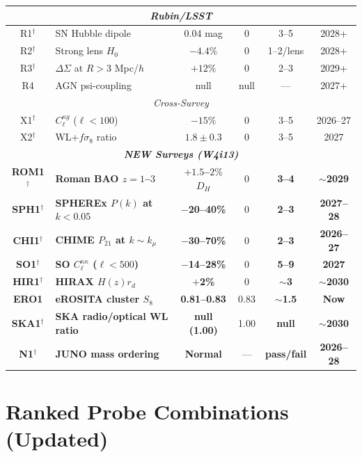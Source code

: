 \documentclass[11pt,a4paper]{article}
\begin{document}
\begin{longtable}{clcccc}
\midrule
\multicolumn{6}{c}{\textit{Rubin/LSST}} \\
\midrule
R1$^{\dagger}$ & SN Hubble dipole & 0.04 mag & 0 & 3--5 & 2028+ \\
R2$^{\dagger}$ & Strong lens $H_0$ & $-4.4\%$ & 0 & 1--2/lens & 2028+ \\
R3$^{\dagger}$ & $\Delta\Sigma$ at $R > 3$ Mpc/$h$ & $+12\%$ & 0 &
2--3 & 2029+ \\
R4 & AGN psi-coupling & null & null & --- & 2027+ \\
\midrule
\multicolumn{6}{c}{\textit{Cross-Survey}} \\
\midrule
X1$^{\dagger}$ & $C_\ell^{\kappa g}$ ($\ell < 100$) & $-15\%$ & 0 &
3--5 & 2026--27 \\
X2$^{\dagger}$ & WL+$f\sigma_8$ ratio & $1.8 \pm 0.3$ & 0 &
3--5 & 2027 \\
\midrule
\multicolumn{6}{c}{\textit{\textbf{NEW Surveys (W4i13)}}} \\
\midrule
\textbf{ROM1}$^{\dagger}$ & \textbf{Roman BAO $z = 1$--$3$} &
\textbf{$+1.5$--$2\%$ $D_H$} & 0 & \textbf{3--4} &
\textbf{$\sim$2029} \\
\textbf{SPH1}$^{\dagger}$ & \textbf{SPHEREx $P(k)$ at $k < 0.05$} &
\textbf{$-$20--40\%} & 0 & \textbf{2--3} & \textbf{2027--28} \\
\textbf{CHI1}$^{\dagger}$ & \textbf{CHIME $P_{21}$ at $k \sim k_\mu$} &
\textbf{$-$30--70\%} & 0 & \textbf{2--3} & \textbf{2026--27} \\
\textbf{SO1}$^{\dagger}$ & \textbf{SO $C_\ell^{\kappa\kappa}$ ($\ell < 500$)} &
\textbf{$-$14--28\%} & 0 & \textbf{5--9} & \textbf{2027} \\
\textbf{HIR1}$^{\dagger}$ & \textbf{HIRAX $H(z) r_d$} &
\textbf{$+$2\%} & 0 & \textbf{$\sim$3} & \textbf{$\sim$2030} \\
\textbf{ERO1} & \textbf{eROSITA cluster $S_8$} &
\textbf{0.81--0.83} & 0.83 & \textbf{$\sim$1.5} & \textbf{Now} \\
\textbf{SKA1}$^{\dagger}$ & \textbf{SKA radio/optical WL ratio} &
\textbf{null (1.00)} & 1.00 & \textbf{null} & \textbf{$\sim$2030} \\
\textbf{N1}$^{\dagger}$ & \textbf{JUNO mass ordering} &
\textbf{Normal} & --- & \textbf{pass/fail} & \textbf{2026--28} \\
\bottomrule
\end{longtable}

\section{Ranked Probe Combinations (Updated)}
\label{sec:ranking}
\end{document}
